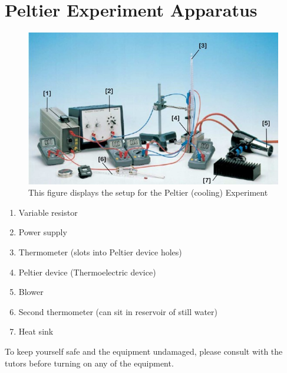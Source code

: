 \documentclass[
  letterpaper,
  DIV=11,
  numbers=noendperiod]{scrreprt}
\begin{document}
\hypertarget{peltier-experiment-apparatus}{%
\section{Peltier Experiment
Apparatus}\label{peltier-experiment-apparatus}}

\begin{figure}

{\centering \includegraphics{./images/PeltierApparatus.jpg}

}

\caption{\label{fig-apparatus}This figure displays the setup for the
Peltier (cooling) Experiment}

\end{figure}

\begin{enumerate}
\def\labelenumi{\arabic{enumi}.}
\item
  Variable resistor
\item
  Power supply
\item
  Thermometer (slots into Peltier device holes)
\item
  Peltier device (Thermoelectric device)
\item
  Blower
\item
  Second thermometer (can sit in reservoir of still water)
\item
  Heat sink
\end{enumerate}

\begin{tcolorbox}[enhanced jigsaw, toprule=.15mm, coltitle=black, bottomrule=.15mm, colbacktitle=quarto-callout-important-color!10!white, opacitybacktitle=0.6, titlerule=0mm, colframe=quarto-callout-important-color-frame, title=\textcolor{quarto-callout-important-color}{\faExclamation}\hspace{0.5em}{Warning}, leftrule=.75mm, bottomtitle=1mm, breakable, opacityback=0, arc=.35mm, left=2mm, colback=white, rightrule=.15mm, toptitle=1mm]

To keep yourself safe and the equipment undamaged, please consult with
the tutors before turning on any of the equipment.

\end{tcolorbox}
\end{document}
